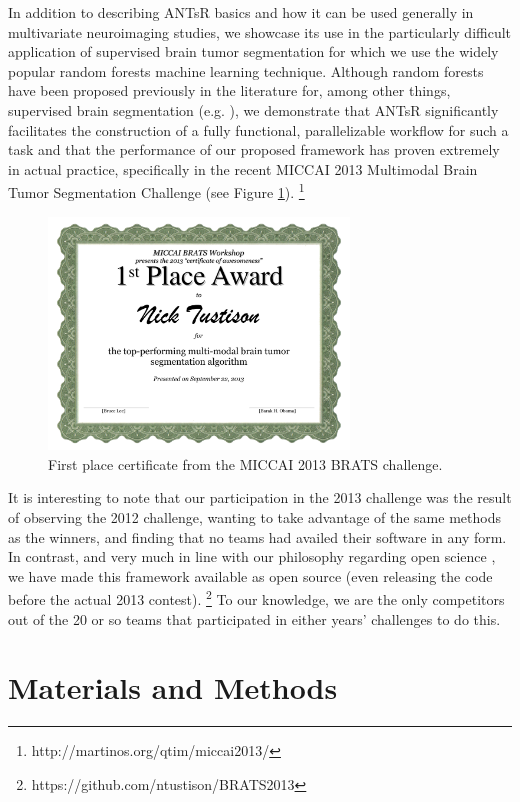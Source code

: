 \documentclass[final,5p,times,twocolumn]{elsarticle}
\begin{document}
In addition to describing ANTsR basics and how it can be
used generally in multivariate neuroimaging studies, we showcase its use in
the particularly difficult application of supervised brain tumor
segmentation \cite{bauer2013} for which we use the widely popular 
random forests machine learning technique.  Although random forests have
been proposed previously in the literature for, among other things, 
supervised brain segmentation (e.g. \cite{geremia2011}), 
we demonstrate that ANTsR significantly facilitates the construction 
of a fully functional, parallelizable workflow for such a task and 
that the performance of our proposed framework has proven extremely in 
actual practice, specifically
 in the recent MICCAI 2013 Multimodal Brain Tumor Segmentation
Challenge (see Figure \ref{fig:award}).%
\footnote{
http://martinos.org/qtim/miccai2013/
}
\begin{figure}
  \centering
  \includegraphics[width=80mm]{Figures/award.pdf}
  \caption{First place certificate from the MICCAI 2013 BRATS challenge.}
  \label{fig:award}
\end{figure}

It is interesting to note that our participation in the 2013 challenge
was the result of observing the 2012
challenge, wanting to take advantage of the same methods as the winners,
and finding that no teams had availed their software in any form.  In contrast, 
and very much in line with our philosophy 
regarding open science \citep{tustison2013,ince2012}, we have made this framework available as open 
source (even releasing the code before the actual 2013 contest).%
\footnote{
https://github.com/ntustison/BRATS2013
}
To our knowledge, we are the only competitors out of the 20 or so teams 
that participated in either years' challenges to do this.

\section{Materials and Methods}
\end{document}
